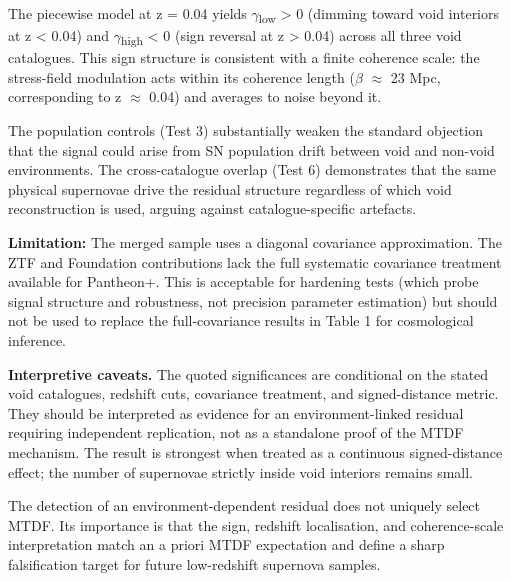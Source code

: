 \documentclass[11pt,a4paper]{article}
\begin{document}
The piecewise model at z = 0.04 yields $\gamma$\textsubscript{low} > 0 (dimming toward void interiors at z < 0.04) and $\gamma$\textsubscript{high} < 0 (sign reversal at z > 0.04) across all three void catalogues. This sign structure is consistent with a finite coherence scale: the stress-field modulation acts within its coherence length ($\beta$ $\approx$ 23 Mpc, corresponding to z $\approx$ 0.04) and averages to noise beyond it.

The population controls (Test 3) substantially weaken the standard objection that the signal could arise from SN population drift between void and non-void environments. The cross-catalogue overlap (Test 6) demonstrates that the same physical supernovae drive the residual structure regardless of which void reconstruction is used, arguing against catalogue-specific artefacts.

\begin{mdframed}[linecolor=accent,linewidth=0.5pt,backgroundcolor=callout-bg,leftline=true,rightline=true,topline=true,bottomline=true,innerleftmargin=8pt,innerrightmargin=8pt,innertopmargin=6pt,innerbottommargin=6pt]
\textbf{Limitation:} The merged sample uses a diagonal covariance approximation. The ZTF and Foundation contributions lack the full systematic covariance treatment available for Pantheon+. This is acceptable for hardening tests (which probe signal structure and robustness, not precision parameter estimation) but should not be used to replace the full-covariance results in Table 1 for cosmological inference.
\end{mdframed}

\begin{mdframed}[linecolor=accent,linewidth=0.5pt,backgroundcolor=callout-bg,leftline=true,rightline=true,topline=true,bottomline=true,innerleftmargin=8pt,innerrightmargin=8pt,innertopmargin=6pt,innerbottommargin=6pt]
\textbf{Interpretive caveats.} The quoted significances are conditional on the stated void catalogues, redshift cuts, covariance treatment, and signed-distance metric. They should be interpreted as evidence for an environment-linked residual requiring independent replication, not as a standalone proof of the MTDF mechanism. The result is strongest when treated as a continuous signed-distance effect; the number of supernovae strictly inside void interiors remains small.

The detection of an environment-dependent residual does not uniquely select MTDF. Its importance is that the sign, redshift localisation, and coherence-scale interpretation match an a priori MTDF expectation and define a sharp falsification target for future low-redshift supernova samples.
\end{mdframed}
\end{document}
